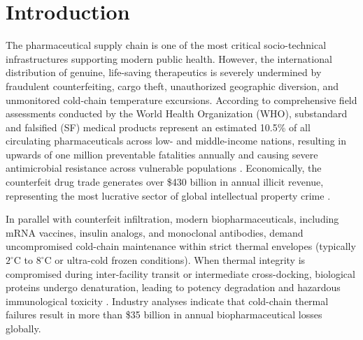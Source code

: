 \documentclass[pdflatex,sn-mathphys-num]{sn-jnl}
\theoremstyle{thmstyleone}
\theoremstyle{thmstyletwo}
\theoremstyle{thmstylethree}
\begin{document}

\maketitle


\section{Introduction}\label{sec:introduction}

The pharmaceutical supply chain is one of the most critical socio-technical infrastructures supporting modern public health. However, the international distribution of genuine, life-saving therapeutics is severely undermined by fraudulent counterfeiting, cargo theft, unauthorized geographic diversion, and unmonitored cold-chain temperature excursions. According to comprehensive field assessments conducted by the World Health Organization (WHO), substandard and falsified (SF) medical products represent an estimated 10.5\% of all circulating pharmaceuticals across low- and middle-income nations, resulting in upwards of one million preventable fatalities annually and causing severe antimicrobial resistance across vulnerable populations \cite{who2024substandard,who2017substandard}. Economically, the counterfeit drug trade generates over \$430 billion in annual illicit revenue, representing the most lucrative sector of global intellectual property crime \cite{mackey2020blockchain}.

In parallel with counterfeit infiltration, modern biopharmaceuticals, including mRNA vaccines, insulin analogs, and monoclonal antibodies, demand uncompromised cold-chain maintenance within strict thermal envelopes (typically $2^\circ\text{C}$ to $8^\circ\text{C}$ or ultra-cold frozen conditions). When thermal integrity is compromised during inter-facility transit or intermediate cross-docking, biological proteins undergo denaturation, leading to potency degradation and hazardous immunological toxicity \cite{tsang2018iot,hosseini2021blockchain}. Industry analyses indicate that cold-chain thermal failures result in more than \$35 billion in annual biopharmaceutical losses globally.
\end{document}
